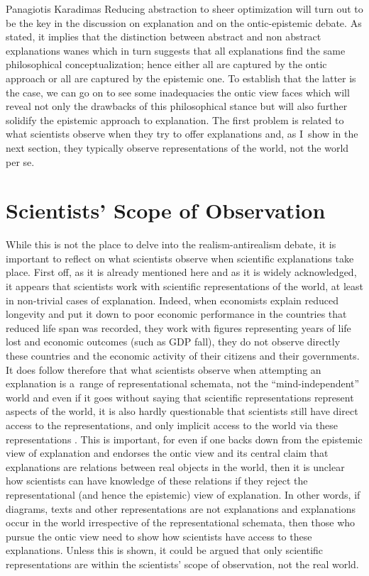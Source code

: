 \begin{artengenv}{Panagiotis Karadimas}
Reducing abstraction to sheer optimization will turn out to be the key in the discussion on explanation and on the ontic-epistemic debate. As stated, it implies that the distinction between abstract and non abstract explanations wanes which in turn suggests that all explanations find the same philosophical conceptualization; hence either all are captured by the ontic approach or all are captured by the epistemic one. To establish that the latter is the case, we can go on to see some inadequacies the ontic view faces which will reveal not only the drawbacks of this philosophical stance but will also further solidify the epistemic approach to explanation. The first problem is related to what scientists observe when they try to offer explanations and, as I~show in the next section, they typically observe representations of the world, not the world per se.

\section{Scientists' Scope of Observation}
While this is not the place to delve into the realism-antirealism debate, it is important to reflect on what scientists observe when scientific explanations take place. First off, as it is already mentioned here and as it is widely acknowledged, it appears that scientists work with scientific representations of the world, at least in non-trivial cases of explanation. Indeed, when economists explain reduced longevity and put it down to poor economic performance in the countries that reduced life span was recorded, they work with figures representing years of life lost and economic outcomes (such as GDP fall), they do not observe directly these countries and the economic activity of their citizens and their governments. It does follow therefore that what scientists observe when attempting an explanation is a~range of representational schemata, not the ``mind-independent'' world and even if it goes without saying that scientific representations represent aspects of the world, it is also hardly questionable that scientists still have direct access to the representations, and only implicit access to the world via these representations
\parencite[][p.254]{van_fraassen_scientific_2008}. %
 This is important, for even if one backs down from the epistemic view of explanation and endorses the ontic view and its central claim that explanations are relations between real objects in the world, then it is unclear how scientists can have knowledge of these relations if they reject the representational (and hence the epistemic) view of explanation. In other words, if diagrams, texts and other representations are not explanations and explanations occur in the world irrespective of the representational schemata, then those who pursue the ontic view need to show how scientists have access to these explanations. Unless this is shown, it could be argued that only scientific representations are within the scientists' scope of observation, not the real world.


\end{artengenv}
